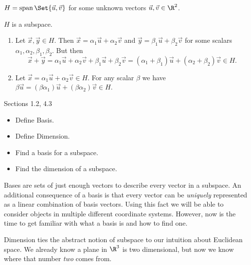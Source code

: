 \documentclass{problemset}
\newcommand{\bookonlynewpage}{\begin{bookonly}\newpage\end{bookonly}}
\begin{document}
\begin{parts}
\begin{solution}
		\end{solution}
		\item $H=\Span\Set{\vec u,\vec v}$ for some unknown vectors $\vec u,\vec v\in\R^2$.
			\begin{solution}
				$H$ is a subspace.

				\begin{enumerate}[label=(\roman*)]
					\item Let $\vec x,\vec y\in H$.
						Then $\vec x=\alpha_1\vec u+\alpha_2\vec v$ and
						$\vec y=\beta_1\vec u+\beta_2\vec v$ for some scalars
						$\alpha_1,\alpha_2,\beta_1,\beta_2$. But then
						\[
							\vec x+\vec y
							=\alpha_1\vec u+\alpha_2\vec v+\beta_1\vec u+\beta_2\vec v
							=(\alpha_1+\beta_1)\vec u+(\alpha_2+\beta_2)\vec v\in H.
						\]

					\item Let $\vec x=\alpha_1\vec u+\alpha_2\vec v\in H$.
						For any	scalar $\beta$ we have
						$\beta\vec u=(\beta\alpha_1)\vec u+(\beta\alpha_2)\vec v\in H$.
				\end{enumerate}
			\end{solution}
	\end{parts}

\begin{lesson}

	Sections 1.2, 4.3

	\begin{itemize}
		\item Define Basis.
		\item Define Dimension.
		\item Find a basis for a subspace.
		\item Find the dimension of a subspace.
	\end{itemize}

	Bases are sets of just enough vectors to describe every vector in a subspace.
	An additional consequence of a basis is that every vector can be \emph{uniquely}
	represented as a linear combination of basis vectors. Using this fact we
	will be able to consider objects in multiple different coordinate systems. However,
	now is the time to get familiar with what a basis is and how to find one.

	Dimension ties the abstract notion of subspace to our intuition about
	Euclidean space. We already know a plane in $\R^3$ is two dimensional,
	but now we know where that number \emph{two} comes from.

\end{lesson}
	\bookonlynewpage
\end{document}
